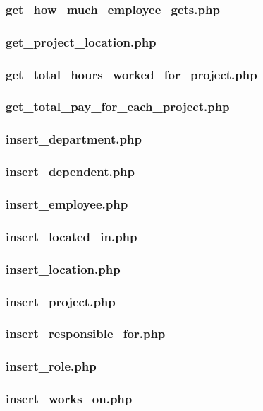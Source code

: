 \documentclass[11pt,letterpaper]{article}
\begin{document}
	\subsubsection{get\_how\_much\_employee\_gets.php}
	\subsubsection{get\_project\_location.php}
	\subsubsection{get\_total\_hours\_worked\_for\_project.php}
	\subsubsection{get\_total\_pay\_for\_each\_project.php}
	\subsubsection{insert\_department.php}
	\subsubsection{insert\_dependent.php}
	\subsubsection{insert\_employee.php}
	\subsubsection{insert\_located\_in.php}
	\subsubsection{insert\_location.php}
	\subsubsection{insert\_project.php}
	\subsubsection{insert\_responsible\_for.php}
	\subsubsection{insert\_role.php}
	\subsubsection{insert\_works\_on.php}
	
\end{document}
